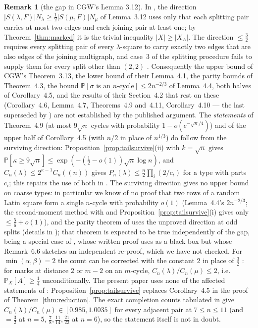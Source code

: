 \documentclass[11pt]{article}
\theoremstyle{definition}
\newtheorem{remark}[theorem]{Remark}
\renewcommand{\Pr}{\mathbb{P}}
\newcommand{\PP}{P}
\newcommand{\CC}{C}
\begin{document}
\begin{remark}[the gap in CGW's Lemma 3.12]\label{rem:gap}
In \cite{CGW08}, the direction $|S(\lambda,F)|N_\lambda\ge\tfrac12|S(\mu,F)|N_\mu$ of
Lemma~3.12 uses only that each splitting pair carries at most two edges and each joining
pair at least one; by Theorem~\ref{thm:marked} it is the trivial inequality $|X|\ge|X_A|$.
The direction $\le\tfrac32$ requires every splitting pair of every $\lambda$-square to carry
exactly two edges that are also edges of the joining multigraph, and case~3 of the splitting
procedure fails to supply them for every split other than $(2,2)$ \cite{gapnote}.
Consequently the upper bound of CGW's Theorem~3.13, the lower bound of their Lemma~4.1,
the parity bounds of Theorem~4.3, the bound $\Pr[\sigma\text{ is an $n$-cycle}]\le2n^{-2/3}$
of Lemma~4.4, both halves of Corollary~4.5, and the results of their Section~4.2 that rest
on these (Corollary~4.6, Lemma~4.7, Theorems~4.9 and~4.11, Corollary~4.10 --- the last
superseded by \cite{KS18}) are not established by the published argument.  The
\emph{statements} of Theorem~4.9 (at most $9\sqrt n$ cycles with probability
$1-o(e^{-\sqrt n/4})$) and of the upper half of Corollary~4.5 (with $n/2$ in place of
$n^{1/3}$) do follow from the surviving direction: Proposition~\ref{prop:tailsurvive}(ii)
with $k=\sqrt n$ gives $\Pr[\kappa\ge9\sqrt n]\le\exp(-(\tfrac12-o(1))\sqrt n\log n)$, and
$\CC_n(\lambda)\le2^{\kappa-1}\CC_n((n))$ gives $\PP_n(\lambda)\le\tfrac n2\prod_i(2/c_i)$
for a type with parts $c_i$; this repairs the use of both in \cite[Thm.~9]{GMW25}.  The
surviving direction gives no upper bound on coarse types: in particular we know of no proof
that two rows of a random Latin square form a single $n$-cycle with probability $o(1)$
(Lemma~4.4's $2n^{-2/3}$; the second-moment method with \cite{KS18} and
Proposition~\ref{prop:tailsurvive}(i) gives only $\le\tfrac56+o(1)$), and the parity theorem
of \cite{CW16} uses the unproved direction at odd splits (details in \cite{gapnote}); that
theorem is expected to be true independently of the gap, being a special case of
\cite[Thm.~1.3(4)]{KPS25}, whose written proof uses \cite{CW16} as a black box but whose
Remark~6.6 sketches an independent re-proof, which we have not checked.  For
$\min(\alpha,\beta)=2$ the count can be corrected with the constant $2$ in place of $\tfrac32$
\cite[Prop.~3]{gapnote}: for marks at distance $2$ or $m-2$ on an $m$-cycle,
$\CC_n(\lambda)/\CC_n(\mu)\le2$, i.e.\ $\Pr_X[A]\ge\tfrac14$ unconditionally.  The present
paper uses none of the affected statements of \cite{CGW08}:
Proposition~\ref{prop:tailsurvive} replaces Corollary~4.5 in the proof of
Theorem~\ref{thm:reduction}.  The exact completion counts tabulated in \cite{CGW08} give
$\CC_n(\lambda)/\CC_n(\mu)\in[0.985,1.0035]$ for every adjacent pair at $7\le n\le11$ (and
$=\tfrac32$ at $n=5$, $\tfrac78,\tfrac{11}{14},\tfrac{21}{22}$ at $n=6$), so the statement
itself is not in doubt.
\end{remark}
\end{document}
